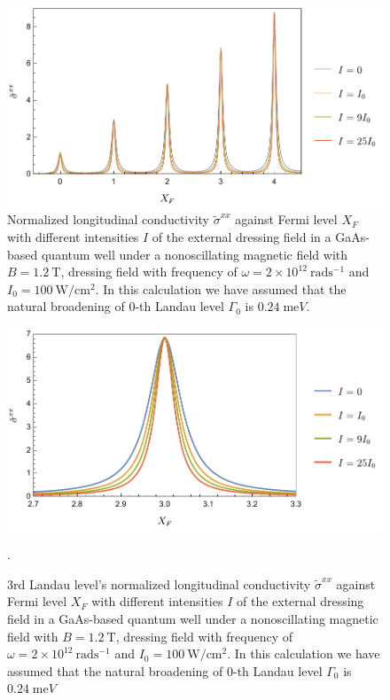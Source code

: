 \begin{figure}[t]
\includegraphics[scale=0.575]{figures/fig_5}
\caption{\label{fig_5} Normalized longitudinal conductivity $\tilde{\sigma}^{xx}$ against Fermi level $X_F$ with different intensities $I$ of the external dressing field in a GaAs-based quantum well under a nonoscillating magnetic field with $B = 1.2~\text{T}$, dressing field with frequency of $\omega =2\times10^{12}~\text{rad}\text{s}^{-1}$ and $I_0 =100~\text{W}/\text{cm}^{2}$. In this calculation we have assumed that the natural  broadening of $0$-th Landau level $\Gamma_0$ is $0.24\;\text{me}V$.}
\end{figure}
\begin{figure}[t]
\includegraphics[scale=0.575]{figures/fig_6}
\caption{\label{fig_6} $3$rd Landau level’s normalized longitudinal conductivity $\tilde{\sigma}^{xx}$ against Fermi level $X_F$ with different intensities $I$ of the external dressing field in a GaAs-based quantum well under a nonoscillating magnetic field with $B = 1.2~\text{T}$, dressing field with frequency of $\omega =2\times10^{12}~\text{rad}\text{s}^{-1}$ and $I_0 =100~\text{W}/\text{cm}^{2}$. In this calculation we have assumed that the natural  broadening of $0$-th Landau level $\Gamma_0$ is $0.24\;\text{me}V$}.
\end{figure}

